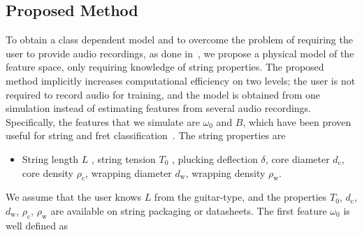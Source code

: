 \documentclass{article}
\begin{document}
\begin{sloppy}
\section{Proposed Method}\label{sec:proposed_method}
To obtain a class dependent model and to overcome the problem of requiring the user to provide audio recordings, as done in~\cite{abesser:automatic_string_detection_ml,barbancho:inharmonicity_tablature,michelson2018_aes,hjerrild::icassp19}, we propose a physical model of the feature space, only requiring knowledge of string properties. The proposed method implicitly increases computational efficiency on two levels; the user is not required to record audio for training, and the model is obtained from one simulation instead of estimating features from several audio recordings. Specifically, the features that we simulate are ${\omega}_0$ and $B$, which have been proven useful for string and fret classification~\cite{barbancho:inharmonicity_tablature, michelson2018_aes,hjerrild::icassp19}. The string properties are
\begin{itemize}
    \item String length $L$%
    , string tension $T_0$%
    , plucking deflection $\delta$, %
    core diameter $ d_\text{c}$, %
    core density $ \rho_\text{c}$, %
    wrapping diameter $ d_\text{w}$, %
    wrapping density $\rho_\text{w}$.%
\end{itemize}
%
We assume that the user knows $L$ from the guitar-type, and the properties ${T_0}$, ${d_\text{c}}$, ${d_\text{w}}$, ${\rho_\text{c}}$, ${\rho_\text{w}}$ are available on string packaging or datasheets. The first feature $\omega_0$ is well defined as
\begin{equation}\label{eq:omega_0}

\end{equation}
\end{sloppy}
\end{document}
